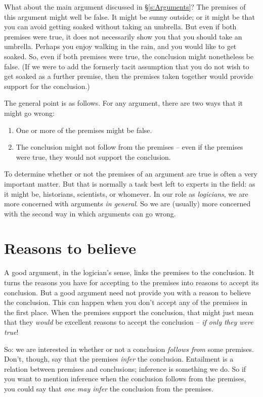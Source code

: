 What about the main argument discussed in §\ref{s:Arguments}? The premises of this argument might well be false. It might be sunny outside; or it might be that you can avoid getting soaked without taking an umbrella. But even if both premises were true, it does not necessarily show you that you should take an umbrella. Perhaps you enjoy walking in the rain, and you would like to get soaked. So, even if both premises were true, the conclusion might nonetheless be false. (If we were to add the formerly tacit assumption that you do not wish to get soaked as a further premise, then the premises taken together would provide support for the conclusion.)


The general point is as follows. For any argument, there are two ways that it might go wrong:
	\begin{enumerate}
		\item One or more of the premises might be false. 
		\item The conclusion might not follow from the premises – even if the premises were true, they would not support the conclusion.
	\end{enumerate}
To determine whether or not the premises of an argument are true is often a very important matter. But that is normally a task best left to experts in the field: as it might be, historians, scientists, or whomever. In our role as \emph{logicians}, we are more concerned with arguments \emph{in general}. So we are (usually) more concerned with the second way in which arguments can go wrong.


\section{Reasons to believe}

A good argument, in the logician's sense, links the premises to the conclusion. It turns the reasons you have for accepting to the premises into reasons to accept its conclusion. But a good argument need not provide you with a reason to believe the conclusion. This can happen when you don't accept any of the premises in the first place. When the premises support the conclusion, that might just mean that they \emph{would} be excellent reasons to accept the conclusion – \emph{if only they were true}!

So: we are interested in whether or not a conclusion \emph{follows from} some premises. Don't, though, say that the premises \emph{infer} the conclusion. Entailment is a relation between premises and conclusions; inference is something we do. So if you want to mention inference when the conclusion follows from the premises, you could say that \emph{one may infer} the conclusion from the premises.

